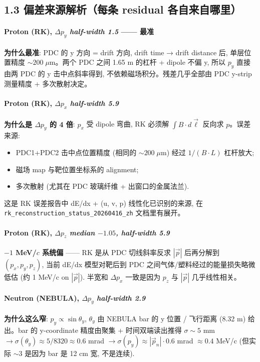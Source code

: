 \documentclass[a4paper,11pt]{article}
\begin{document}
\subsection*{1.3 偏差来源解析（每条 residual 各自来自哪里）}

\paragraph{Proton (RK), $\Delta p_y$ \textit{half-width 1.5} —— 最准}
\textbf{为什么最准}: PDC 的 y 方向 = drift 方向, drift time → drift distance 后, 单层位置精度 $\sim 200\;\mu\text{m}$。两个 PDC 之间 1.65 m 的杠杆 + dipole 不偏 y, 所以 $p_y$ 直接由两 PDC 的 y 击中点斜率得到, 不依赖磁场积分。残差几乎全部由 PDC y-strip 测量精度 + 多次散射决定。

\paragraph{Proton (RK), $\Delta p_x$ \textit{half-width 5.9}}
\textbf{为什么是 $\Delta p_y$ 的 4 倍}: $p_x$ 受 dipole 弯曲, RK 必须解 $\int B \cdot d\vec\ell$ 反向求 $p$。误差来源:
\begin{itemize}[nosep]
\item PDC1+PDC2 击中点位置精度 (相同的 $\sim 200\;\mu\text{m}$) 经过 $1/(B \cdot L)$ 杠杆放大;
\item 磁场 map 与靶位置坐标系的 alignment;
\item 多次散射 (尤其在 PDC 玻璃纤维 + 出窗口的金属法兰).
\end{itemize}
这是 RK 误差报告中 dE/dx + (u, v, p) 线性化已识别的来源, 在 \texttt{rk\_reconstruction\_status\_20260416\_zh} 文档里有展开。

\paragraph{Proton (RK), $\Delta p_z$ \textit{median $-1.05$, half-width 5.9}}
\textbf{$-1$ MeV/$c$ 系统偏} —— RK 是从 PDC 切线斜率反求 $|\vec p|$ 后再分解到 $(p_x, p_y, p_z)$, 当前 dE/dx 模型对靶后到 PDC 之间气体/塑料经过的能量损失略微低估 (约 1 MeV/c on $|\vec p|$). 半宽和 $\Delta p_x$ 一致是因为 $p_z$ 与 $|\vec p|$ 几乎线性相关。

\paragraph{Neutron (NEBULA), $\Delta p_y$ \textit{half-width 2.9}}
\textbf{为什么这么窄}: $p_y \propto \sin\theta_y$, $\theta_y$ 由 NEBULA bar 的 y 位置 / 飞行距离 (8.32 m) 给出。bar 的 y-coordinate 精度由聚集 + 时间双端读出推得 $\sigma \sim 5$ mm $\to \sigma(\theta_y) \approx 5/8320 \approx 0.6$ mrad $\to \sigma(p_y) \approx |\vec p_n| \cdot 0.6$ mrad $\approx 0.4$ MeV/c (但实际 $\sim 3$ 是因为 bar 是 12 cm 宽, 不是连续).
\end{document}
